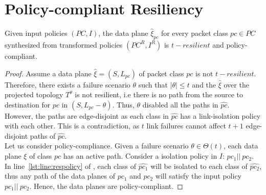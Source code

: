\section{Policy-compliant Resiliency}
\begin{theorem}[Soundness]
	Given input policies $(PC, I)$, 
	the data plane $\hat{\xi}_{pc}$ for every packet class $pc \in PC$
	synthesized from
	transformed policies $(PC^R, I^R)$  is $t-resilient$ 
	and policy-compliant. 
	\end{theorem}
	\begin{proof}
		Assume a data plane $\hat{\xi} = (S, L_{pc})$ of packet class $pc$ is not $t-resilient$. 
		Therefore, there exists a failure scenario $\theta$ such that $|\theta| \leq t$ 
		and  the $\hat{\xi}$ over the projected topology $T^\theta$ 
		is not resilient, i.e there is no path from the source to destination for
		$pc$ in $(S,L_{pc} - \theta)$.
		Thus, $\theta$ disabled all the paths in $\hat{pc}$. \\
		However, the paths are
		edge-disjoint as each class in $\hat{pc}$ has a link-isolation policy with each 
		other. This is a contradiction, as $t$ link failures cannot affect $t+1$ 
		edge-disjoint paths of $\hat{pc}$. \\
		Let us consider policy-compliance. Given a failure scenario $\theta \in \Theta(t)$, each data plane $\xi$ of class $pc$ has an active path. Consider a isolation policy in $I$: $pc_1 || \ pc_2$. In line~\ref{lst:line:respolicy} of , each class of $\hat{pc_1}$ will be isolated to
		each class of $\hat{pc_2}$, thus any path of the data planes of $pc_1$ and
		$pc_2$ will satisfy the input policy $pc_1 || \ pc_2$. Hence, the data planes 
		are policy-compliant. 
		\end{proof}

